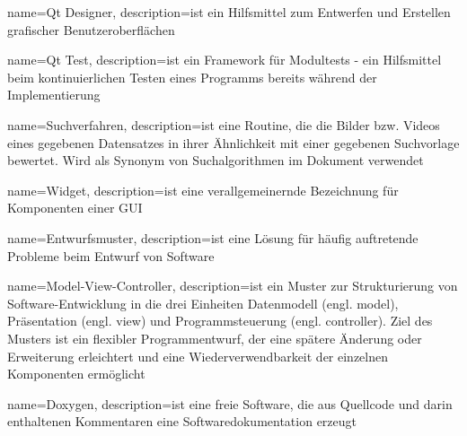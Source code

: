 {
name=Qt Designer,
description={ist ein Hilfsmittel zum Entwerfen und Erstellen grafischer Benutzeroberflächen}
}

{
name=Qt Test,
description={ist ein Framework für Modultests - ein Hilfsmittel beim kontinuierlichen Testen eines Programms bereits während der Implementierung}
}

{
name=Suchverfahren,
description={ist eine Routine, die die Bilder bzw. Videos eines gegebenen Datensatzes in ihrer Ähnlichkeit mit einer gegebenen Suchvorlage bewertet. \newline Wird als Synonym von Suchalgorithmen im Dokument verwendet}
}

{
name=Widget,
description={ist eine verallgemeinernde Bezeichnung für Komponenten einer \gls{GUI}}
}

{
name=Entwurfsmuster,
description={ist eine Lösung für häufig auftretende Probleme beim Entwurf von Software}
}

{
name=Model-View-Controller,
description={ist ein Muster zur Strukturierung von Software-Entwicklung in die drei Einheiten Datenmodell (engl. model), Präsentation (engl. view) und Programmsteuerung (engl. controller). Ziel des Musters ist ein flexibler Programmentwurf, der eine spätere Änderung oder Erweiterung erleichtert und eine Wiederverwendbarkeit der einzelnen Komponenten ermöglicht}
}

{
name=Doxygen,
description={ist eine freie Software, die aus Quellcode und darin enthaltenen Kommentaren eine Softwaredokumentation erzeugt}
}
